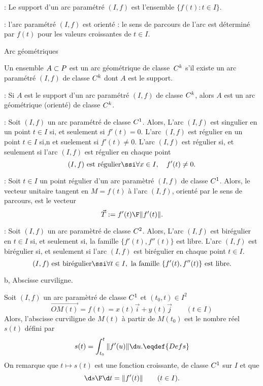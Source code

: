 \Rappel : Le support d'un arc paramétré $(I,f)$ est l'ensemble $\{f(t):t\in I\}$. 
\bigskip

\Remarque : l'arc paramétré $(I,f)$ est orienté : le sens de parcours de l'arc est déterminé par $f(t)$ pour les valeurs croissantes de $t\in I$. 
\bigskip

\Concept Arc géométriques

\Definition[] Un ensemble $A\subset\sc P$ est un arc géométrique de classe~$\sc C^k$  
s'il existe un arc paramétré $(I,f)$ de classe $\sc C^k$ dont $A$ est le support. 
\bigskip

\Remarque : Si $A$ est le support d'un arc paramétré $(I,f)$ de classe $\sc C^k$, alors $A$ est un arc géométrique (orienté) de classe $\sc C^k$. 
\bigskip


\Rappel :  Soit $(I,f)$ un arc paramétré de classe $\sc C^1$. Alors, \medskip\noindent
L'arc $(I,f)$ est singulier en un point $t\in I$ si, et seulement si $f'(t)=0$. \medskip\noindent
L'arc $(I,f)$ est régulier en un point $t\in I$ si,n et suelement si $f'(t)\neq 0$. \medskip\noindent
L'arc $(I,f)$ est régulier si, et seulement si 
l'arc $(I,f)$ est régulier en chaque point 
$$
(I,f)\mbox{ est régulier}\ssi\forall x\in I, \quad f'(t)\neq 0.
$$

\Rappel :  Soit $t\in I$ un point régulier d'un arc paramètré $(I,f)$ de classe $\sc C^1$. 
Alors, le vecteur unitaire tangent en $M=f(t)$ à l'arc $(I,f)$, orienté par le sens de parcours, est le vecteur 
$$
\vec T:={f'(t)\F\|f'(t)\|}. 
$$


\Rappel :  Soit $(I,f)$ un arc paramètré de classe $\sc C^2$. Alors, \medskip\noindent
L'arc $(I,f)$ est birégulier en $t\in I$ si, et seulement si, la famille $\{f'(t), f''(t)\}$ est libre. \medskip\noindent
L'arc $(I,f)$ est birégulier si, et seulement si l'arc $(I,f)$ est birégulier en chaque point $t\in I$. 
$$
(I,f)\mbox{ est birégulier}\ssi\forall t\in I,\mbox{ la famille }\{f'(t),f''(t)\} \mbox{ est libre}.
$$



\Section b, Abscisse curviligne. 


\Definition []  Soit $(I,f)$ un arc paramètré de classe $\sc C^1$ et $(t_0,t)\in I^2$
$$
\vec{OM(t)}=f(t)=x(t)\vec i+y(t)\vec j\qquad (t\in I)
$$
Alors, l'abscisse curviligne de $M(t)$ à partir de $M(t_0)$ est le nombre réel $s(t)$ défini par 
$$
s(t)=\int_{t_0}^t\|f'(u)\|\d u. \eqdef{Defs}
$$
On remarque que $t\mapsto s(t)$ est une fonction croissante, de classe $\sc C^1$ sur $I$ et que 
$$
{\d s\F\d t}=\|f'(t)\|\qquad(t\in I).
$$



